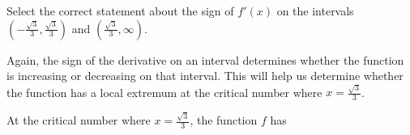\documentclass{ximera}
\begin{document}
\begin{example}
\begin{explanation}
\begin{question}
  \begin{multipleChoice}
           \end{multipleChoice}
  \end{question}
  \begin{question}
Select the correct  statement about the sign of $f'(x)$ on the intervals  $\left(-\frac{\sqrt{3}}{3},\frac{\sqrt{3}}{3}\right)$ and  $\left(\frac{\sqrt{3}}{3},\infty\right)$. \\
 
  \begin{multipleChoice}
  \end{multipleChoice}
  \end{question}
Again, the sign of the derivative on an interval determines whether the function is increasing or decreasing on that interval. This will help us determine whether the function has a local extremum at the critical number  where $x=\frac{\sqrt{3}}{3}$. \\
  \begin{question}

At the critical number where $x=\frac{\sqrt{3}}{3}$, the function $f$ has  \\
 

\end{question}
\end{explanation}
\end{example}
\end{document}
